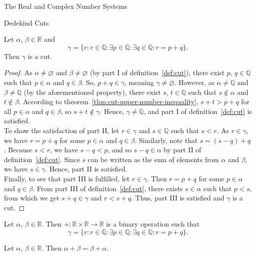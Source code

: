 \begin{chapter}{The Real and Complex Number Systems}
\begin{section}{Dedekind Cuts}
	\begin{theorem}
	\label{thm:cut-addition-closure}
		Let $\alpha$, $\beta \in \mathbb{R}$ and
		\[ \gamma = \{r : r \in \mathbb{Q} : \exists p \in \mathbb{Q}
			: \exists q \in \mathbb{Q} : r = p + q\}. \] 
		Then $\gamma$ is a cut.
	\end{theorem}

	\begin{proof}
		As $\alpha \neq \varnothing$ and $\beta \neq \varnothing$ (by part I of
		definition~\ref{def:cut}), there exist $p$, $q \in \mathbb{Q}$ such that
		$p \in \alpha$ and $q \in \beta$. So, $p + q \in \gamma$, meaning
		$\gamma \neq \varnothing$. However, as $\alpha \neq \mathbb{Q}$ and
		$\beta \neq \mathbb{Q}$ (by the aforementioned property), there exist
		$s$, $t \in \mathbb{Q}$ such that $s \nin \alpha$ and $t \nin \beta$.
		According to theorem~\ref{thm:cut-upper-number-inequality}, $s + t > p +
		q$ for all $p \in \alpha$ and $q \in \beta$, so $s + t \nin \gamma$.
		Hence, $\gamma \neq \mathbb{Q}$, and part I of definition~\ref{def:cut}
		is satisfied. \\

		To show the satisfaction of part II, let $r \in \gamma$ and $s \in
		\mathbb{Q}$ such that $s < r$. As $r \in \gamma$, we have $r = p +
		q$ for some $p \in \alpha$ and $q \in \beta$. Similarly, note that $s
		= (s - q) + q$. Because $s < r$, we have $s - q < p$, and so $s - q
		\in \alpha$ by part II of definition~\ref{def:cut}. Since $s$ can be
		written as the sum of elements from $\alpha$ and $\beta$, we have $s
		\in \gamma$. Hence, part II is satisfied. \\

		Finally, to see that part III is fulfilled, let $r \in \gamma$. Then $r 
		= p + q$ for some $p \in \alpha$ and $q \in \beta$. From part III of
		definition~\ref{def:cut}, there exists $s \in \alpha$ such that $p <
		s$, from which we get $s + q \in \gamma$ and $r < s + q$. Thus, part
		III is satisfied and $\gamma$ is a cut.
	\end{proof}

	\begin{definition}
		\label{def:cut-addition}
		Let $\alpha$, $\beta \in \mathbb{R}$. Then $+ \colon \mathbb{R} \times
		\mathbb{R} \to \mathbb{R}$ is a binary operation such that
		\[ \gamma = \{r : r \in \mathbb{Q} : \exists p \in \mathbb{Q}
			: \exists q \in \mathbb{Q} : r = p + q\}. \] 
	\end{definition}

	\begin{theorem}
		\label{thm:cut-addition-commutativity}
		Let $\alpha$, $\beta \in \mathbb{R}$. Then $\alpha + \beta = \beta +
		\alpha$.
	\end{theorem}


\end{section}
\end{chapter}
